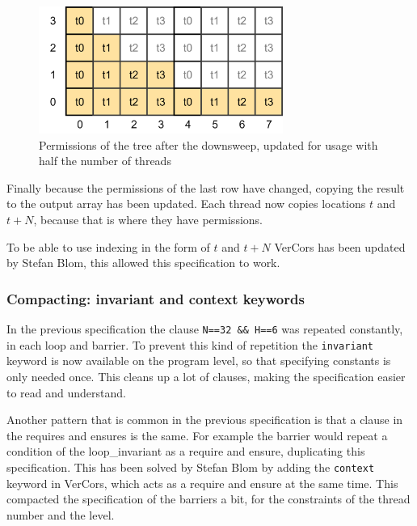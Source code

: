 \documentclass[a4paper]{article}
\newcommand{\code}[1]{\texttt{\small \color{inline}#1}} %
\begin{document}
\begin{figure}[htb!]
	\centering
	\includegraphics[width=80mm]{../images/tree-permissions-end-halfthreads-v1.png}
	\caption{Permissions of the tree after the downsweep, updated for usage with half the number of threads}
	\label{fig:treeArrayPermissionsEndHalfThreads}
\end{figure}
\FloatBarrier

Finally because the permissions of the last row have changed, copying the result to the output array has been updated. Each thread now copies locations $t$ and $t+N$, because that is where they have permissions.

To be able to use indexing in the form of $t$ and $t+N$ VerCors has been updated by Stefan Blom, this allowed this specification to work.

\subsubsection{Compacting: invariant and context keywords}
In the previous specification the clause \code{N==32 \&\& H==6} was repeated constantly, in each loop and barrier. To prevent this kind of repetition the \code{invariant} keyword is now available on the program level, so that specifying constants is only needed once. This cleans up a lot of clauses, making the specification easier to read and understand.

Another pattern that is common in the previous specification is that a clause in the requires and ensures is the same. For example the barrier would repeat a condition of the loop\_invariant as a require and ensure, duplicating this specification. This has been solved by Stefan Blom by adding the \code{context} keyword in VerCors, which acts as a require and ensure at the same time. This compacted the specification of the barriers a bit, for the constraints of the thread number and the level.
\end{document}
